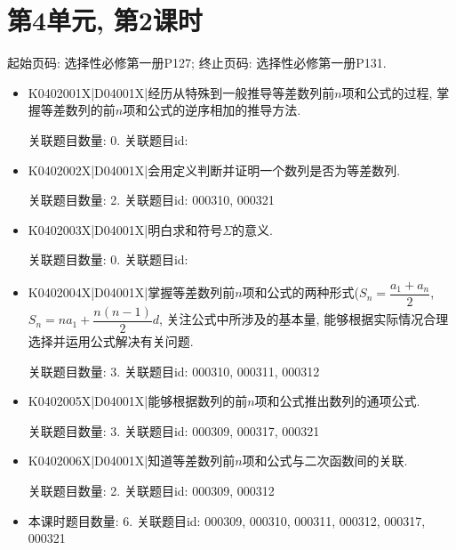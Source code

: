 \section*{第4单元, 第2课时}
起始页码: 选择性必修第一册P127; 终止页码: 选择性必修第一册P131.
\begin{itemize}
\item K0402001X|D04001X|经历从特殊到一般推导等差数列前$n$项和公式的过程, 掌握等差数列的前$n$项和公式的逆序相加的推导方法.

关联题目数量: 0. 关联题目id: 

\item K0402002X|D04001X|会用定义判断并证明一个数列是否为等差数列.

关联题目数量: 2. 关联题目id: 000310, 000321

\item K0402003X|D04001X|明白求和符号$\Sigma$的意义.

关联题目数量: 0. 关联题目id: 

\item K0402004X|D04001X|掌握等差数列前$n$项和公式的两种形式($S_{n}=\dfrac{a_{1}+a_{n}}{2}$, $S_{n}=na_{1}+\dfrac{n(n-1)}{2}d$, 关注公式中所涉及的基本量, 能够根据实际情况合理选择并运用公式解决有关问题.

关联题目数量: 3. 关联题目id: 000310, 000311, 000312

\item K0402005X|D04001X|能够根据数列的前$n$项和公式推出数列的通项公式.

关联题目数量: 3. 关联题目id: 000309, 000317, 000321

\item K0402006X|D04001X|知道等差数列前$n$项和公式与二次函数间的关联.

关联题目数量: 2. 关联题目id: 000309, 000312

\item 本课时题目数量: 6. 关联题目id: 000309, 000310, 000311, 000312, 000317, 000321

\end{itemize}

